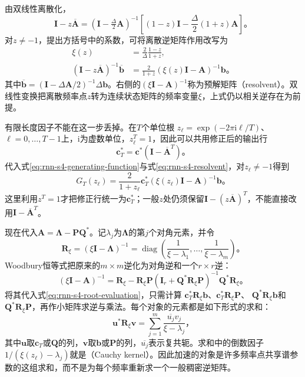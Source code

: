 由双线性离散化，
\[
  \bm I-z\overline{\bm A}
    =(\bm I-\tfrac{\Delta}{2}\bm A)^{-1}
      \left[(1-z)\bm I-\frac{\Delta}{2}(1+z)\bm A\right]\text{。}
\]
对$z\neq-1$，提出方括号中的系数，可将离散逆矩阵作用改写为
\begin{equation}
  \begin{aligned}
    \xi(z)&=\frac{2}{\Delta}\frac{1-z}{1+z},\\
    (\bm I-z\overline{\bm A})^{-1}\overline{\bm b}
      &=\frac{2}{1+z}(\xi(z)\bm I-\bm A)^{-1}\bm b\text{。}
  \end{aligned}
  \label{eq:rnn-s4-resolvent}
\end{equation}
其中$\overline{\bm b}=(\bm I-\Delta\bm A/2)^{-1}\Delta\bm b$。右侧的$(\xi\bm I-\bm A)^{-1}$称为预解矩阵（resolvent）。双线性变换把离散频率点$z$转为连续状态矩阵的频率变量$\xi$，上式仍以相关逆存在为前提。

有限长度因子不能在这一步丢掉。在$T$个单位根
$z_\ell=\exp(-2\pi\mathrm i\ell/T)$、$\ell=0,\ldots,T-1$上，$\mathrm i$为虚数单位，$z_\ell^T=1$，因此可以共用修正后的输出行
\begin{equation}
  \bm c_T^*=\bm c^*(\bm I-\overline{\bm A}^{T})\text{。}
  \label{eq:rnn-s4-finite-readout}
\end{equation}
代入式\eqref{eq:rnn-s4-generating-function}与式\eqref{eq:rnn-s4-resolvent}，对$z_\ell\neq-1$得到
\begin{equation}
  G_T(z_\ell)=\frac{2}{1+z_\ell}
    \bm c_T^*(\xi(z_\ell)\bm I-\bm A)^{-1}\bm b\text{。}
  \label{eq:rnn-s4-root-evaluation}
\end{equation}
这里利用$z^T=1$才把修正行统一为$\bm c_T^*$；一般$z$处仍须保留$\bm I-(z\overline{\bm A})^T$，不能直接改用$\bm I-\overline{\bm A}^T$。

现在代入$\bm A=\bm\Lambda-\bm P\bm Q^*$。记$\lambda_j$为$\bm\Lambda$的第$j$个对角元素，并令
\[
  \bm R_\xi=(\xi\bm I-\bm\Lambda)^{-1}
    =\operatorname{diag}\!\left(
       \frac1{\xi-\lambda_1},\ldots,\frac1{\xi-\lambda_m}\right)\text{。}
\]
Woodbury恒等式把原来的$m\times m$逆化为对角逆和一个$r\times r$逆：
\begin{equation}
  (\xi\bm I-\bm A)^{-1}
    =\bm R_\xi-\bm R_\xi\bm P
       (\bm I_r+\bm Q^*\bm R_\xi\bm P)^{-1}
       \bm Q^*\bm R_\xi\text{。}
  \label{eq:rnn-s4-woodbury}
\end{equation}
将其代入式\eqref{eq:rnn-s4-root-evaluation}，只需计算
$\bm c_T^*\bm R_\xi\bm b$、$\bm c_T^*\bm R_\xi\bm P$、
$\bm Q^*\bm R_\xi\bm b$和$\bm Q^*\bm R_\xi\bm P$，再作小矩阵求逆与乘法。每个对象的元素都是如下形式的求和：
\begin{equation}
  \bm u^*\bm R_\xi\bm v
    =\sum_{j=1}^{m}\frac{\overline{u_j}v_j}{\xi-\lambda_j}\text{，}
  \label{eq:rnn-s4-cauchy-sum}
\end{equation}
其中$\bm u$取$\bm c_T$或$\bm Q$的列，$\bm v$取$\bm b$或$\bm P$的列，$\overline{u_j}$表示复共轭。求和中的倒数因子$1/(\xi(z_\ell)-\lambda_j)$就是（Cauchy kernel）。因此加速的对象是许多频率点共享谱参数的这组求和，而不是为每个频率重新求一个一般稠密逆矩阵。

